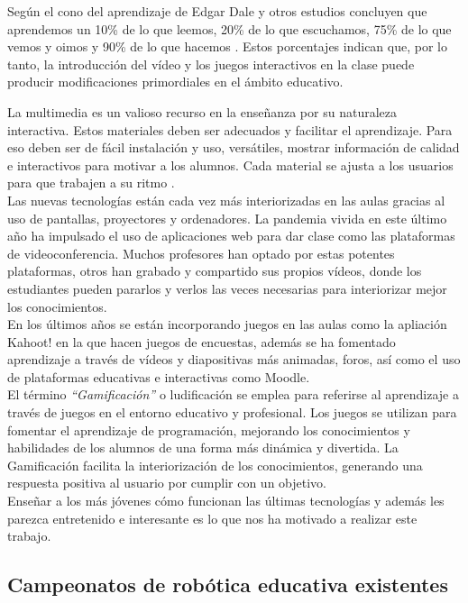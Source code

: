 Según el cono del aprendizaje de Edgar Dale y otros estudios concluyen que aprendemos un 10\% de lo que leemos, 20\% de lo que escuchamos, 75\% de lo que vemos y oimos y 
90\% de lo que hacemos \cite{videoeducativo}\cite{aprendizaje}. Estos porcentajes indican que, por lo tanto, la introducción del vídeo y los juegos interactivos en la clase puede producir modificaciones primordiales en el ámbito educativo.

La multimedia es un valioso recurso en la enseñanza por su naturaleza interactiva. Estos  materiales  deben ser adecuados y facilitar el aprendizaje. Para eso deben ser de fácil instalación y uso, versátiles, mostrar información de calidad e interactivos para motivar a los alumnos. Cada material se ajusta a los usuarios para que trabajen a su ritmo \cite{importanciamultimedia}.
\\
Las nuevas tecnologías están cada vez más interiorizadas en las aulas gracias al uso de pantallas, proyectores y ordenadores. La pandemia vivida en este último año ha impulsado el uso de aplicaciones web para dar clase como las plataformas de videoconferencia. Muchos profesores han optado por estas potentes plataformas, otros han grabado y compartido sus propios vídeos, donde los estudiantes pueden pararlos y verlos las veces necesarias para interiorizar mejor los conocimientos.
\\
En los últimos años se están incorporando juegos en las aulas como la apliación Kahoot! \cite{kahoot} en la que hacen juegos de encuestas, además se ha fomentado aprendizaje a través de vídeos y diapositivas más animadas, foros, así como el uso de plataformas educativas e interactivas como Moodle.
\\

 El término \textit{``Gamificación''} o ludificación se emplea para referirse al aprendizaje a través de juegos en el entorno educativo y profesional. Los juegos se utilizan para fomentar el aprendizaje de programación, mejorando los conocimientos y habilidades de los alumnos de una forma más dinámica y divertida. La Gamificación facilita la interiorización de los conocimientos, generando una respuesta positiva al usuario por cumplir con un objetivo.
 \\
 Enseñar a los más jóvenes cómo funcionan las últimas tecnologías y además les parezca entretenido e interesante es lo que nos ha motivado a realizar este trabajo.
 
 
\subsection{Campeonatos de robótica educativa existentes}

